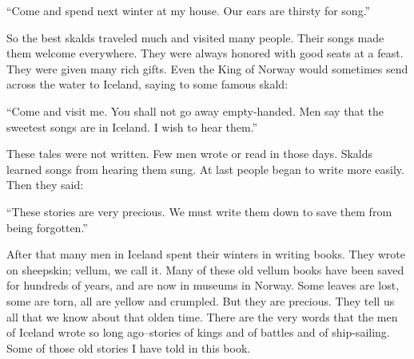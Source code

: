 ``Come and spend next winter at my house. Our ears are thirsty for
song.''

So the best skalds traveled much and visited many people. Their songs
made them welcome everywhere. They were always honored with good seats
at a feast. They were given many rich gifts. Even the King of Norway
would sometimes send across the water to Iceland, saying to some famous
skald:

``Come and visit me. You shall not go away empty-handed. Men say that
the sweetest songs are in Iceland. I wish to hear them.''

These tales were not written. Few men wrote or read in those days.
Skalds learned songs from hearing them sung. At last people began to
write more easily. Then they said:

``These stories are very precious. We must write them down to save them
from being forgotten.''

After that many men in Iceland spent their winters in writing books.
They wrote on sheepskin; vellum, we call it. Many of these old vellum
books have been saved for hundreds of years, and are now in museums in
Norway. Some leaves are lost, some are torn, all are yellow and
crumpled. But they are precious. They tell us all that we know about
that olden time. There are the very words that the men of Iceland wrote
so long ago--stories of kings and of battles and of ship-sailing. Some
of those old stories I have told in this book.
